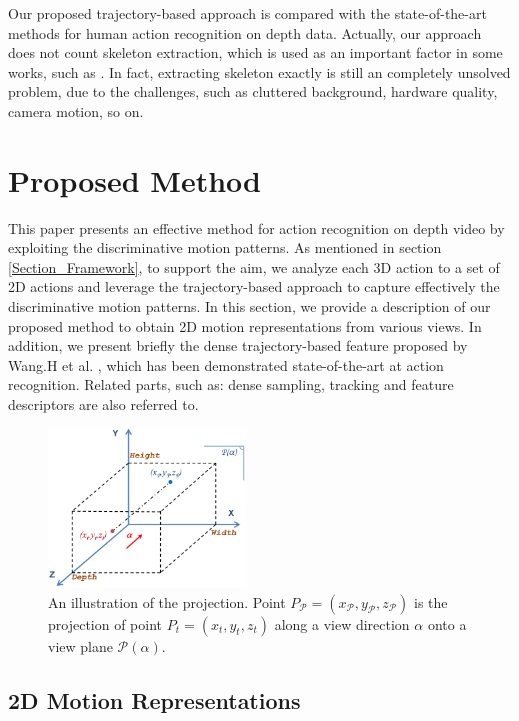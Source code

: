 \documentclass[final,3p,times,twocolumn]{elsarticle}
\begin{document}
Our proposed trajectory-based approach is compared with the state-of-the-art methods for human action recognition on depth data.
Actually, our approach does not count skeleton extraction, which is used as an important factor in some works, such as \cite{wang2012mining, yang2012eigenjoints, luo2013group}.
In fact, extracting skeleton exactly is still an completely unsolved problem, due to the challenges, such as cluttered background, hardware quality, camera motion, so on.

\section{Proposed Method}
\label{Section_ProposedMethod}

This paper presents an effective method for action recognition on depth video by exploiting the discriminative motion patterns.
As mentioned in section \ref{Section_Framework}, to support the aim, we analyze each 3D action to a set of 2D actions and leverage the trajectory-based approach to capture effectively the discriminative motion patterns.
In this section, we provide a description of our proposed method to obtain 2D motion representations from various views.
In addition, we present briefly the dense trajectory-based feature proposed by Wang.H et al. \cite{wang2011densetraj}, which has been demonstrated state-of-the-art at action recognition.
Related parts, such as: dense sampling, tracking and feature descriptors are also referred to.

\begin{figure}[h]
	\centering
	\includegraphics[width=0.47\textwidth]{Figures/Figure_PointProjection.pdf} %
	\caption{\label{lbl:Figure_PointProjection}An illustration of the projection. Point $P_\mathcal{P} = (x_\mathcal{P},y_\mathcal{P},z_\mathcal{P})$ is the projection of point $P_t  = (x_t,y_t,z_t)$ along a view direction $\alpha$ onto a view plane $\mathcal{P}(\alpha)$.}
\end{figure}

\subsection{2D Motion Representations}
\end{document}
